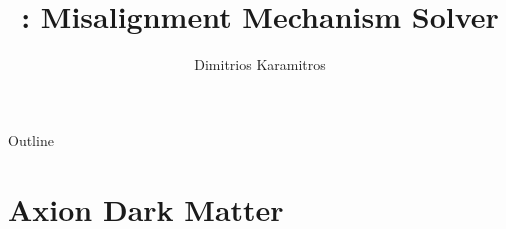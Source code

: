 \documentclass[10pt,utf8,compress,xcolor=dvipsnames]{beamer}
\title[]{\mimes: Misalignment Mechanism Solver}
\author{Dimitrios Karamitros}
\institute{
	Manchester U.\\
\begin{figure}\vspace{-0.0cm}
\end{figure}
}
\date{\bl{23/11/2021}\\{\sl El Journal Club más Sabroso} \\[1cm] \begin{center}Avalible on:\\\bl{\href{https://github.com/dkaramit/MiMeS}{github}\\\href{https://mimes.hepforge.org}{hepforge}}\end{center} }
\begin{document}
	
	\begin{frame}
		\titlepage

	\end{frame}

	\begin{frame}{Outline}
	 \fontL \tableofcontents[]
	\end{frame}


\section{Axion Dark Matter}
\end{document}
